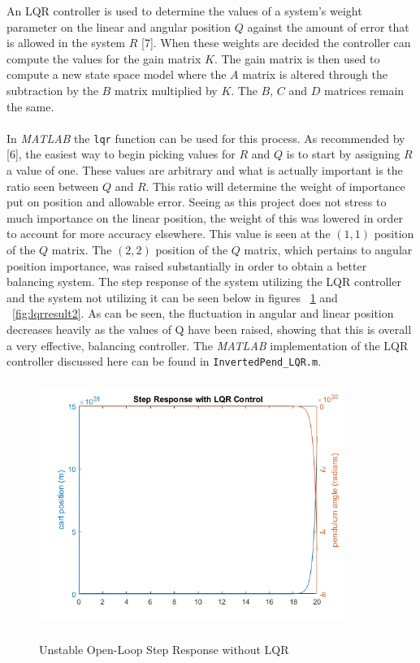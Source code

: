 \documentclass[12pt]{article} %
\begin{document}
An LQR controller is used to determine the values of a system’s weight parameter on the linear and angular position $Q$ against the amount of error that is allowed in the system $R$ [7]. When these weights are decided the controller can compute the values for the gain matrix $K$. The gain matrix is then used to compute a new state space model where the $A$ matrix is altered through the subtraction by the $B$ matrix multiplied by $K$. The $B$, $C$ and $D$ matrices remain the same. 
\\\\
In \textit{MATLAB} the \texttt{lqr} function can be used for this process. As recommended by [6], the easiest way to begin picking values for $R$ and $Q$ is to start by assigning $R$ a value of one. These values are arbitrary and what is actually important is the ratio seen between $Q$ and $R$. This ratio will determine the weight of importance put on position and allowable error. Seeing as this project does not stress to much importance on the linear position, the weight of this was lowered in order to account for more accuracy elsewhere. This value is seen at the $(1,1)$ position of the $Q$ matrix. The $(2,2)$ position of the $Q$ matrix, which pertains to angular position importance, was raised substantially in order to obtain a better balancing system. The step response of the system utilizing the LQR controller and the system not utilizing it can be seen below in figures ~\ref{fig:lqrresult1} and ~\ref{fig:lqrresult2}. As can be seen, the fluctuation in angular and linear position decreases heavily as the values of Q have been raised, showing that this is overall a very effective, balancing controller. The \textit{MATLAB} implementation of the LQR controller discussed here can be found in \texttt{InvertedPend\_LQR.m}.
\FloatBarrier
\begin{figure}[h]
\caption{Unstable Open-Loop Step Response without LQR}
\includegraphics[height=8cm, width=10cm]{LQRno.png}
\label{fig:lqrresult1}
\centering
\end{figure}
\end{document}
